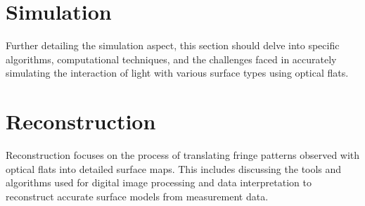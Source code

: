 \documentclass[../main.tex]{subfiles}
\begin{document}
\section{Simulation}
Further detailing the simulation aspect, this section should delve into specific algorithms, computational techniques, and the challenges faced in accurately simulating the interaction of light with various surface types using optical flats.

\section{Reconstruction}
Reconstruction focuses on the process of translating fringe patterns observed with optical flats into detailed surface maps. This includes discussing the tools and algorithms used for digital image processing and data interpretation to reconstruct accurate surface models from measurement data.
\end{document}
